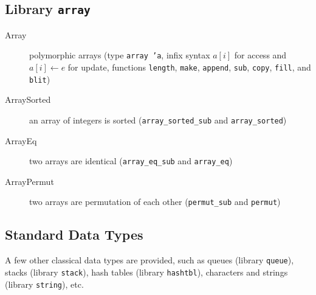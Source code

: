 \subsection{Library \texttt{array}}

\begin{description}
\item[Array]polymorphic arrays (type \texttt{array 'a}, infix
  syntax $a[i]$ for access and $a[i] \leftarrow e$ for update,
  functions \texttt{length}, \texttt{make}, \texttt{append},
  \texttt{sub}, \texttt{copy}, \texttt{fill}, and \texttt{blit})
\item[ArraySorted] an array of integers is sorted
  (\verb|array_sorted_sub| and \verb|array_sorted|)
\item[ArrayEq] two arrays are identical
  (\verb|array_eq_sub| and \verb|array_eq|)
\item[ArrayPermut] two arrays are permutation of each other
  (\verb|permut_sub| and \verb|permut|)
\end{description}

\subsection{Standard Data Types}

A few other classical data types are provided, such as queues (library
\texttt{queue}), stacks (library \texttt{stack}), hash tables (library
\texttt{hashtbl}), characters and strings (library \texttt{string}),
etc.


